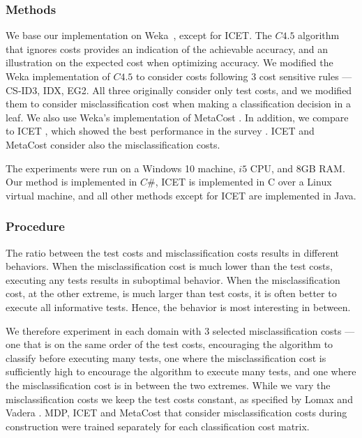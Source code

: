 \documentclass[letterpaper]{article}
\theoremstyle{definition}
\begin{document}
\subsubsection{Methods}

We base our implementation on Weka~\cite{Weka}, except for ICET. The $C4.5$ algorithm that ignores costs provides an indication of the achievable accuracy, and an illustration on the expected cost when optimizing accuracy. We modified the Weka implementation of $C4.5$ to consider costs following 3 cost sensitive rules --- CS-ID3, IDX, EG2. All three originally consider only test costs, and we modified them to consider misclassification cost when making a classification decision in a leaf. We also use Weka's implementation of MetaCost \cite{domingos1999metacost}. In addition, we compare to ICET \cite{turney1995cost}, which showed the best performance in the survey \cite{LomaxV11}. ICET and MetaCost consider also the misclassification costs. 

The experiments were run on a Windows 10 machine, $i5$ CPU, and 8GB RAM. Our method is implemented in $C\#$, ICET is implemented in C over a Linux virtual machine, and all other methods except for ICET are implemented in Java.


\subsubsection{Procedure}

The ratio between the test costs and misclassification costs results in different behaviors. When the misclassification cost is much lower than the test costs, executing any tests results in suboptimal behavior. When the misclassification cost, at the other extreme, is much larger than test costs, it is often better to execute all informative tests. Hence, the behavior is most interesting in between.

We therefore experiment in each domain with 3 selected misclassification costs --- one that is on the same order of the test costs, encouraging the algorithm to classify before executing many tests, one where the misclassification cost is sufficiently high to encourage the algorithm to execute many tests, and one where the misclassification cost is in between the two extremes. While we vary the misclassification costs we keep the test costs constant, as specified by Lomax and Vadera . MDP, ICET and MetaCost that consider misclassification costs during construction were trained separately for each classification cost matrix.
\end{document}
